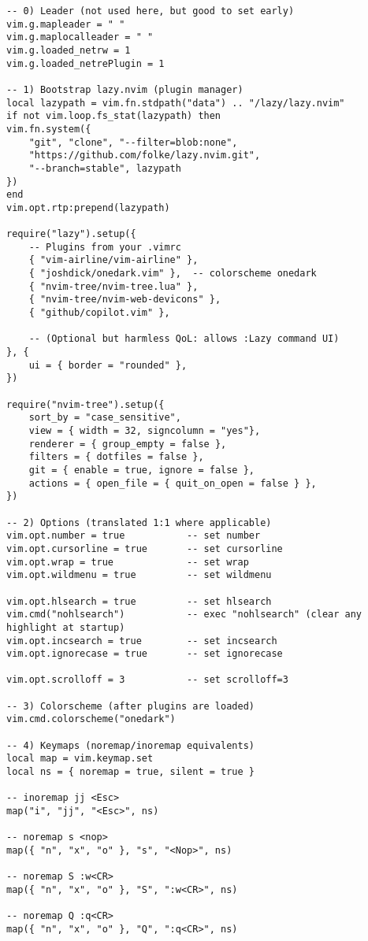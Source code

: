\begin{lstlisting}
-- 0) Leader (not used here, but good to set early)
vim.g.mapleader = " "
vim.g.maplocalleader = " "
vim.g.loaded_netrw = 1
vim.g.loaded_netrePlugin = 1

-- 1) Bootstrap lazy.nvim (plugin manager)
local lazypath = vim.fn.stdpath("data") .. "/lazy/lazy.nvim"
if not vim.loop.fs_stat(lazypath) then
vim.fn.system({
	"git", "clone", "--filter=blob:none",
	"https://github.com/folke/lazy.nvim.git",
	"--branch=stable", lazypath
})
end
vim.opt.rtp:prepend(lazypath)

require("lazy").setup({
	-- Plugins from your .vimrc
	{ "vim-airline/vim-airline" },
	{ "joshdick/onedark.vim" },  -- colorscheme onedark
	{ "nvim-tree/nvim-tree.lua" },
	{ "nvim-tree/nvim-web-devicons" },
	{ "github/copilot.vim" },
	
	-- (Optional but harmless QoL: allows :Lazy command UI)
}, {
	ui = { border = "rounded" },
})

require("nvim-tree").setup({
	sort_by = "case_sensitive",
	view = { width = 32, signcolumn = "yes"},
	renderer = { group_empty = false },
	filters = { dotfiles = false },
	git = { enable = true, ignore = false },
	actions = { open_file = { quit_on_open = false } },
})

-- 2) Options (translated 1:1 where applicable)
vim.opt.number = true           -- set number
vim.opt.cursorline = true       -- set cursorline
vim.opt.wrap = true             -- set wrap
vim.opt.wildmenu = true         -- set wildmenu

vim.opt.hlsearch = true         -- set hlsearch
vim.cmd("nohlsearch")           -- exec "nohlsearch" (clear any highlight at startup)
vim.opt.incsearch = true        -- set incsearch
vim.opt.ignorecase = true       -- set ignorecase

vim.opt.scrolloff = 3           -- set scrolloff=3

-- 3) Colorscheme (after plugins are loaded)
vim.cmd.colorscheme("onedark")

-- 4) Keymaps (noremap/inoremap equivalents)
local map = vim.keymap.set
local ns = { noremap = true, silent = true }

-- inoremap jj <Esc>
map("i", "jj", "<Esc>", ns)

-- noremap s <nop>
map({ "n", "x", "o" }, "s", "<Nop>", ns)

-- noremap S :w<CR>
map({ "n", "x", "o" }, "S", ":w<CR>", ns)

-- noremap Q :q<CR>
map({ "n", "x", "o" }, "Q", ":q<CR>", ns)


\end{lstlisting}
